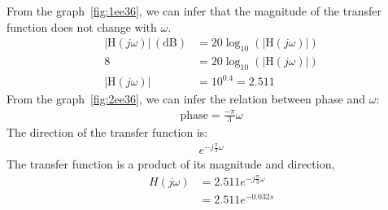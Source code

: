\documentclass[journal,12pt,twocolumn]{IEEEtran}
\theoremstyle{remark}
\begin{document}
    \solution
    From the graph~\ref{fig:1ee36}, we can infer that the magnitude of the transfer function does not change with $\omega$.
    \begin{align}
        |\mathrm{H}(j\omega)|\, (\mathrm{dB}) &= 20\log_{10}(|\mathrm{H}(j\omega)|) \nonumber \\
        8 &= 20\log_{10}(|\mathrm{H}(j\omega)|) \nonumber \\
        |\mathrm{H}(j\omega)| &= 10^{0.4} = 2.511
    \end{align}
    From the graph~\ref{fig:2ee36}, we can infer the relation between phase and $\omega$:
    \begin{align}
        \text{phase} = \frac{-\pi}{3}\omega
    \end{align}
    The direction of the transfer function is:
    \begin{align}
        e^{-j\frac{\pi}{3}\omega}
    \end{align}
    The transfer function is a product of its magnitude and direction,
    \begin{align}
        H(j\omega) &= 2.511 e^{-j\frac{\pi}{3}\omega} \\
        &= 2.511 e^{-0.032s}
    \end{align}
    \setcounter{figure}{1} %
\end{document}
